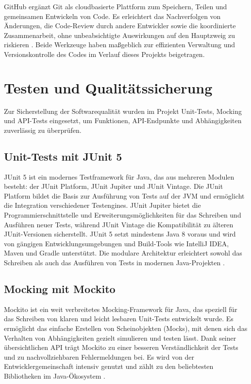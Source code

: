 \noindent GitHub ergänzt Git als cloudbasierte Plattform zum Speichern, Teilen und gemeinsamen Entwickeln von Code. Es erleichtert das Nachverfolgen von Änderungen, die Code-Review durch andere Entwickler sowie die koordinierte Zusammenarbeit, ohne unbeabsichtigte Auswirkungen auf den Hauptzweig zu riskieren \cite{GITHUB2025b}. Beide Werkzeuge haben maßgeblich zur effizienten Verwaltung und Versionskontrolle des Codes im Verlauf dieses Projekts beigetragen.

\section{Testen und Qualitätssicherung}

Zur Sicherstellung der Softwarequalität wurden im Projekt Unit-Tests, Mocking und API-Tests eingesetzt, um Funktionen, API-Endpunkte und Abhängigkeiten zuverlässig zu überprüfen.

\subsection{Unit-Tests mit JUnit 5}

JUnit 5 ist ein modernes Testframework für Java, das aus mehreren Modulen besteht: der JUnit Platform, JUnit Jupiter und JUnit Vintage. Die JUnit Platform bildet die Basis zur Ausführung von Tests auf der JVM und ermöglicht die Integration verschiedener Testengines. JUnit Jupiter bietet die Programmierschnittstelle und Erweiterungsmöglichkeiten für das Schreiben und Ausführen neuer Tests, während JUnit Vintage die Kompatibilität zu älteren JUnit-Versionen sicherstellt. JUnit 5 setzt mindestens Java 8 voraus und wird von gängigen Entwicklungsumgebungen und Build-Tools wie IntelliJ IDEA, Maven und Gradle unterstützt. Die modulare Architektur erleichtert sowohl das Schreiben als auch das Ausführen von Tests in modernen Java-Projekten \cite{JUNIT52025}.

\subsection{Mocking mit Mockito}

Mockito ist ein weit verbreitetes Mocking-Framework für Java, das speziell für das Schreiben von klaren und leicht lesbaren Unit-Tests entwickelt wurde. Es ermöglicht das einfache Erstellen von Scheinobjekten (Mocks), mit denen sich das Verhalten von Abhängigkeiten gezielt simulieren und testen lässt. Dank seiner übersichtlichen API trägt Mockito zu einer besseren Verständlichkeit der Tests und zu nachvollziehbaren Fehlermeldungen bei. Es wird von der Entwicklergemeinschaft intensiv genutzt und zählt zu den beliebtesten Bibliotheken im Java-Ökosystem \cite{MOCKITO2025}.

